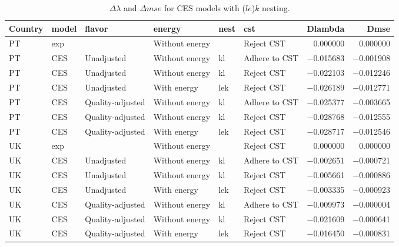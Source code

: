 \documentclass[preprint,authoryear,12pt]{elsarticle}\usepackage[]{graphicx}\usepackage[]{color}
\begin{document}
%
\begin{table}[ht]
\centering
\caption{$\Delta \lambda$ and $\Delta mse$ for CES models with ($le$)$k$ nesting.} 
\label{tab:DSRmse_CESlek}
{\tiny
\begin{tabular}{llllllrr}
  \hline
Country & model & flavor & energy & nest & cst & Dlambda & Dmse \\ 
  \hline
PT & exp &  & Without energy &  & Reject CST & 0.000000 & 0.000000 \\ 
  PT & CES & Unadjusted & Without energy & kl & Adhere to CST & $-$0.015683 & $-$0.001908 \\ 
  PT & CES & Unadjusted & Without energy & kl & Reject CST & $-$0.022103 & $-$0.012246 \\ 
  PT & CES & Unadjusted & With energy & lek & Reject CST & $-$0.026189 & $-$0.012771 \\ 
  PT & CES & Quality-adjusted & Without energy & kl & Adhere to CST & $-$0.025377 & $-$0.003665 \\ 
  PT & CES & Quality-adjusted & Without energy & kl & Reject CST & $-$0.028768 & $-$0.012555 \\ 
  PT & CES & Quality-adjusted & With energy & lek & Reject CST & $-$0.028717 & $-$0.012546 \\ 
  UK & exp &  & Without energy &  & Reject CST & 0.000000 & 0.000000 \\ 
  UK & CES & Unadjusted & Without energy & kl & Adhere to CST & $-$0.002651 & $-$0.000721 \\ 
  UK & CES & Unadjusted & Without energy & kl & Reject CST & $-$0.005661 & $-$0.000886 \\ 
  UK & CES & Unadjusted & With energy & lek & Reject CST & $-$0.003335 & $-$0.000923 \\ 
  UK & CES & Quality-adjusted & Without energy & kl & Adhere to CST & $-$0.009973 & $-$0.000004 \\ 
  UK & CES & Quality-adjusted & Without energy & kl & Reject CST & $-$0.021609 & $-$0.000641 \\ 
  UK & CES & Quality-adjusted & With energy & lek & Reject CST & $-$0.016450 & $-$0.000831 \\ 
   \hline
\end{tabular}
}
\end{table}
\end{document}
